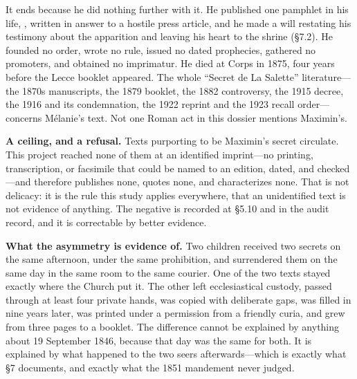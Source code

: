 It ends because he did nothing further with it. He published one
pamphlet in his life, , written in answer to a hostile press
article, and he made a will restating his testimony about the
apparition and leaving his heart to the shrine (\S7.2). He founded
no order, wrote no rule, issued no dated prophecies, gathered no
promoters, and obtained no imprimatur. He died at Corps in 1875,
four years before the Lecce booklet appeared. The whole ``Secret de
La Salette'' literature---the 1870s manuscripts, the 1879 booklet,
the 1882 controversy, the 1915 decree, the 1916  and
its condemnation, the 1922 reprint and the 1923 recall
order---concerns Mélanie's text. Not one Roman act in this dossier
mentions Maximin's.

\textbf{A ceiling, and a refusal.} Texts purporting to be Maximin's
secret circulate. This project reached none of them at an identified
imprint---no printing, transcription, or facsimile that could be
named to an edition, dated, and checked---and therefore publishes
none, quotes none, and characterizes none. That is not delicacy: it
is the rule this study applies everywhere, that an unidentified text
is not evidence of anything. The negative is recorded at \S5.10 and
in the audit record, and it is correctable by better
evidence.

\textbf{What the asymmetry is evidence of.} Two children received
two secrets on the same afternoon, under the same prohibition, and
surrendered them on the same day in the same room to the same
courier. One of the two texts stayed exactly where the Church put
it. The other left ecclesiastical custody, passed through at least
four private hands, was copied with deliberate gaps, was filled in
nine years later, was printed under a permission from a friendly
curia, and grew from three pages to a booklet. The difference cannot
be explained by anything about 19 September 1846, because that day
was the same for both. It is explained by what happened to the two
seers afterwards---which is exactly what \S7 documents, and exactly
what the 1851 mandement never judged.

